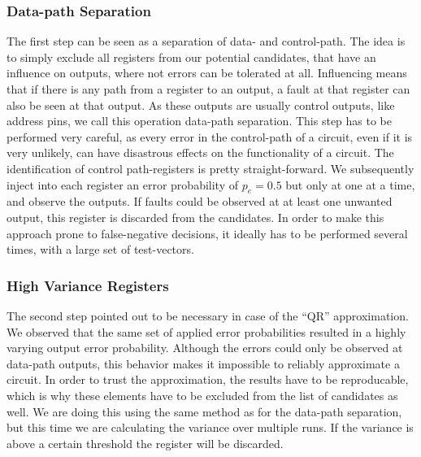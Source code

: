 \documentclass[conference]{IEEEtran}
\begin{document}
\subsubsection{Data-path Separation}
The first step can be seen as a separation of data- and control-path. The idea is to simply exclude all registers from our potential candidates, that have an influence on outputs, where not errors can be tolerated at all. Influencing means that if there is any path from a register to an output, a fault at that register can also be seen at that output. As these outputs are usually control outputs, like address pins, we call this operation data-path separation. This step has to be performed very careful, as every error in the control-path of a circuit, even if it is very unlikely, can have disastrous effects on the functionality of a circuit. The identification of control path-registers is pretty straight-forward. We subsequently inject into each register an error probability of $p_e=0.5$ but only at one at a time, and observe the outputs. If faults could be observed at at least one unwanted output, this register is discarded from the candidates. In order to make this approach prone to false-negative decisions, it ideally has to be performed several times, with a large set of test-vectors.
\subsubsection{High Variance Registers}
The second step pointed out to be necessary in case of the ``QR'' approximation. We observed that the same set of applied error probabilities resulted in a highly varying output error probability. Although the errors could only be observed at data-path outputs, this behavior makes it impossible to reliably approximate a circuit. In order to trust the approximation, the results have to be reproducable, which is why these elements have to be excluded from the list of candidates as well. We are doing this using the same method as for the data-path separation, but this time we are calculating the variance over multiple runs. If the variance is above a certain threshold the register will be discarded.
\end{document}
